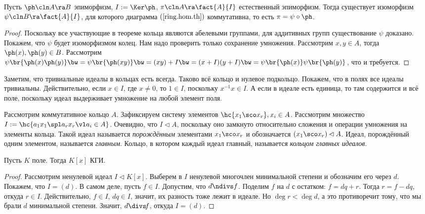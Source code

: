 \documentclass[a4paper]{article}
\newcommand{\kph}{\Ker \ph}
\begin{document}
\begin{theorem}
Пусть $\ph\cln A \ra B$ эпиморфизм, $I := \kph$, $\pi\cln A \ra \fact{A}{I}$  естественный эпиморфизм.
Тогда существует изоморфизм $\psi\cln B \ra \fact{A}{I}$, для которого диаграмма $(\ref{ring.hom.th})$
коммутативна, то есть $\pi = \psi \circ \ph$. 
\end{theorem}
\begin{proof}
Поскольку все участвующие в теореме кольца являются абелевыми группами, для  аддитивных групп существование
$\psi$ доказано. Покажем, что $\psi$ будет изоморфизмом колец. Нам надо проверить только сохранение
умножения. Рассмотрим $x,y \in A$, тогда $\ph(x), \ph(y) \in B$. Рассмотрим
$\psi\br{\ph(x)\ph(y)}\bw=\psi\br{\ph(xy)}\bw=(xy)+I\bw=(x+I)(y+I)\bw=\psi\br{\ph(x)}\psi\br{\ph(y)}$, что и требуется.
\end{proof}

Заметим, что тривиальные идеалы в кольцах есть всегда. Таково всё кольцо и  нулевое подкольцо. Покажем, что в
полях все идеалы тривиальны. Действительно, если $x \in I$, где $x \neq 0$, то $1 \in I$, поскольку $x^{-1}x
\in I$. А если в идеале есть единица, то там содержится и всё поле, поскольку идеал выдерживает умножение на
любой элемент поля.

\begin{df}
Рассмотрим коммутативное кольцо $A$. Зафиксируем систему элементов  $\hc{x_1\sco x_r}, x_i \in A$. Рассмотрим
множество $I := \hc{a_1x_1 \spl a_rx_r\vl a_i \in A}$. Очевидно, что $I \lhd A$, поскольку оно замкнуто
относительно сложения и операции умножения на элементы кольца. Такой идеал называется \emph{порождённым}
элементами $x_1\sco x_r$ и обозначается $(x_1\sco x_r) \lhd A$. Идеал, порождённый одним элементом,
называется \emph{главным}. Кольцо, в котором каждый идеал главный, называется \emph{кольцом главных идеалов}.
\end{df}

\begin{theorem}
Пусть $K$ поле. Тогда $K[x]$ КГИ.
\end{theorem}
\begin{proof}
Рассмотрим ненулевой идеал $I \lhd K[x]$. Выберем в $I$ ненулевой многочлен  минимальной степени и обозначим
его через $d$. Покажем, что $I = (d)$. В самом деле, пусть $f \in I$. Допустим, что $d \ndivs f$. Поделим $f$
на $d$ с остатком: $f=dq+r$. Тогда $r=f-dq$, откуда $r \in I$. Действительно, $f \in I$, $dq \in I$, значит, их
разность тоже лежит в идеале. Но $\deg r < \deg d$, а это противоречит тому, что мы брали $d$ минимальной
степени. Значит, $d \divs \!f$, откуда $I=(d)$.
\end{proof}
\end{document}
